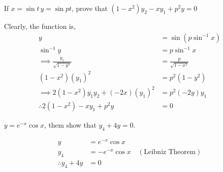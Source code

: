 \begin{asign}
	If $x=\sin t\, y=\sin pt$, prove that $(1-x^2)y_2-xy_1+p^2y=0$
\end{asign}
\begin{anse}
	Clearly, the function is,
	\[\begin{split}
		y&=\sin(p\sin^{-1}x)\\
		\sin^{-1}y&=p\sin^{-1}x\\
		\implies \frac{y_1}{\sqrt{1-y^2}}&=\frac{p}{\sqrt{1-x^2}}\\
		(1-x^2)(y_1)^2&=p^2(1-y^2)\\
		\implies 2(1-x^2)y_1y_2 + (-2x)(y_1)^2&=p^2(-2y)y_1\\
		\therefore 2(1-x^2)-xy_1+p^2y&=0
	\end{split}\]
\end{anse}
\begin{asign}
	$y=e^{-x}\cos x$, them show that $y_4+4y=0$.
\end{asign}
\begin{anse}
	\[\begin{split}
		y&=e^{-x}\cos x\\
		y_4&=-e^{-x}\cos x \quad (\text{Leibniz Theorem})\\
		\therefore y_4+4y&=0
	\end{split}\]
\end{anse}
